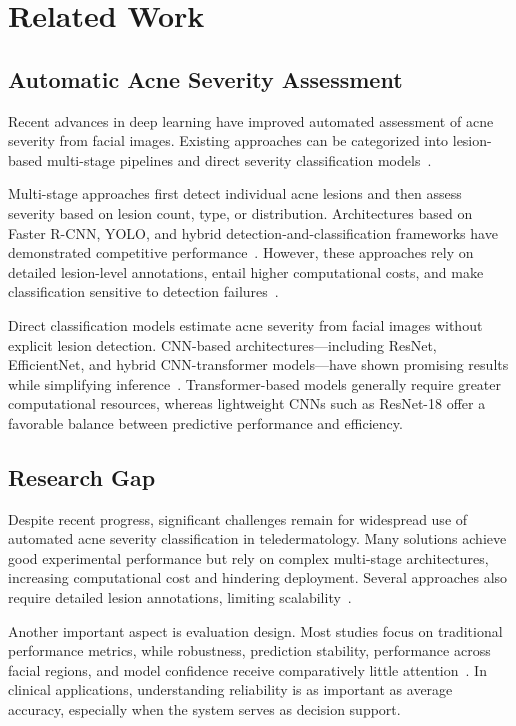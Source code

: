 \documentclass[conference]{IEEEtran}
\begin{document}
\section{Related Work}
\subsection{Automatic Acne Severity Assessment}
Recent advances in deep learning have improved automated assessment of acne severity from facial images. Existing approaches can be categorized into lesion-based multi-stage pipelines and direct severity classification models~\cite{choy2023,huynh2022,lin2022,liu2022}.

Multi-stage approaches first detect individual acne lesions and then assess severity based on lesion count, type, or distribution. Architectures based on Faster R-CNN, YOLO, and hybrid detection-and-classification frameworks have demonstrated competitive performance~\cite{huynh2022,wen2022,lin2023}. However, these approaches rely on detailed lesion-level annotations, entail higher computational costs, and make classification sensitive to detection failures~\cite{wongvibulsin2024,reynolds2024}.

Direct classification models estimate acne severity from facial images without explicit lesion detection. CNN-based architectures---including ResNet, EfficientNet, and hybrid CNN-transformer models---have shown promising results while simplifying inference~\cite{lin2022,lin2023,gao2025}. Transformer-based models generally require greater computational resources, whereas lightweight CNNs such as ResNet-18 offer a favorable balance between predictive performance and efficiency.

\subsection{Research Gap}
Despite recent progress, significant challenges remain for widespread use of automated acne severity classification in teledermatology. Many solutions achieve good experimental performance but rely on complex multi-stage architectures, increasing computational cost and hindering deployment. Several approaches also require detailed lesion annotations, limiting scalability~\cite{huynh2022,nguyen2024,gazeau2024}.

Another important aspect is evaluation design. Most studies focus on traditional performance metrics, while robustness, prediction stability, performance across facial regions, and model confidence receive comparatively little attention~\cite{choy2023}. In clinical applications, understanding reliability is as important as average accuracy, especially when the system serves as decision support.
\end{document}
